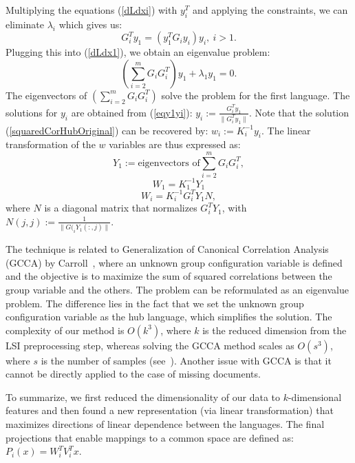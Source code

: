 Multiplying the equations (\ref{dLdxi}) with $y_i^T$ and applying the
constraints, we can eliminate $\lambda_i$ which gives us:
\begin{equation}\label{eqy1yi}
G_{i}^T y_1 = \left(y_1^T G_{i} y_i \right) y_i,~i > 1.
\end{equation}
Plugging this into (\ref{dLdx1}), we obtain an eigenvalue problem:
$$\left( \sum_{i = 2}^m G_i G_{i}^T \right) y_1 + \lambda_1 y_1 = 0.$$
The eigenvectors of $\left( \sum_{i = 2}^m G_i G_{i}^T \right)$ solve
the problem for the first language. The solutions for $y_i$ are obtained
from (\ref{eqy1yi}): $y_i := \frac{G_{i}^T y_1}{\| G_{i}^T y_1 \|}$.
Note that the solution (\ref{squaredCorHubOriginal}) can be recovered
by: $w_i := K_i^{-1} y_i$. The linear transformation of the $w$
variables are thus expressed as:
$$ Y_1 := \text{eigenvectors of} \sum_{i = 2}^m G_i G_{i}^T, $$
$$ W_1 = K_1^{-1} Y_1 $$
$$ W_i = K_i^{-1} G_{i}^T Y_1 N,$$
where $N$ is a diagonal matrix that normalizes $G_{i}^T Y_1$, with
$N(j,j) := \frac{1}{\|G(_{i} Y_1(:,j)\|}$.

 The technique is related to  Generalization of Canonical
Correlation Analysis (GCCA) by Carroll~\citeyear{Carroll}, where an unknown
group configuration variable is defined and the objective is to maximize the
sum of squared correlations between the group variable and the others. The
problem can be reformulated as an eigenvalue problem. The difference lies in
the fact that we set the unknown group configuration variable as the hub language,
which simplifies the solution. The complexity of our method is $O(k^3)$, where $k$
is the reduced dimension from the LSI preprocessing step, whereas solving the
GCCA method scales as $O(s^3)$, where $s$ is the number of samples (see~\cite{gifi}).
Another issue with GCCA is that it cannot be directly applied to the case of missing documents.

To summarize, we first reduced the dimensionality of our data to $k$-dimensional 
features and then found a new representation (via linear transformation) that 
maximizes directions of linear dependence between the languages. The final 
projections that enable mappings to a common space are defined as: 
$P_i(x) = W_i^T V_i^T x.$


